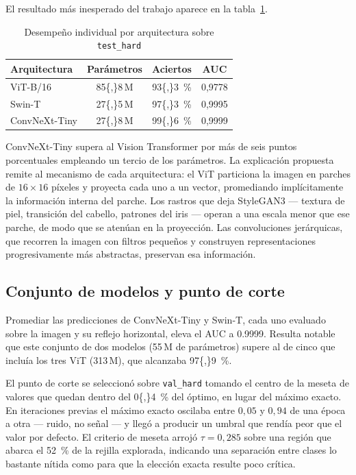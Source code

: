 \documentclass[10pt,twocolumn,letterpaper]{article}
\begin{document}
El resultado más inesperado del trabajo aparece en la
tabla~\ref{tab:arquitecturas}.

\begin{table}[t]
\caption{Desempeño individual por arquitectura sobre \texttt{test\_hard}}
\label{tab:arquitecturas}
\centering\small
\begin{tabular}{lccc}
\toprule
\textbf{Arquitectura} & \textbf{Parámetros} & \textbf{Aciertos} & \textbf{AUC} \\
\midrule
ViT-B/16        & \num{85{,}8}\,M & \SI{93{,}3}{\percent} & 0,9778 \\
Swin-T          & \num{27{,}5}\,M & \SI{97{,}3}{\percent} & 0,9995 \\
ConvNeXt-Tiny   & \num{27{,}8}\,M & \SI{99{,}6}{\percent} & 0,9999 \\
\bottomrule
\end{tabular}
\end{table}

ConvNeXt-Tiny supera al Vision Transformer por más de seis puntos
porcentuales empleando un tercio de los parámetros. La explicación
propuesta remite al mecanismo de cada arquitectura: el ViT particiona la
imagen en parches de $16\times16$ píxeles y proyecta cada uno a un vector,
promediando implícitamente la información interna del parche. Los rastros
que deja StyleGAN3 --- textura de piel, transición del cabello, patrones del
iris --- operan a una escala menor que ese parche, de modo que se atenúan
en la proyección. Las convoluciones jerárquicas, que recorren la imagen con
filtros pequeños y construyen representaciones progresivamente más
abstractas, preservan esa información.

\subsection{Conjunto de modelos y punto de corte}

Promediar las predicciones de ConvNeXt-Tiny y Swin-T, cada uno evaluado
sobre la imagen y su reflejo horizontal, eleva el AUC a \num{0.9999}.
Resulta notable que este conjunto de dos modelos
(\num{55}\,M de parámetros) supere al de cinco que incluía los
tres ViT (\num{313}\,M), que alcanzaba \SI{97{,}9}{\percent}.

El punto de corte se seleccionó sobre \texttt{val\_hard} tomando el centro
de la meseta de valores que quedan dentro del \SI{0{,}4}{\percent} del
óptimo, en lugar del máximo exacto. En iteraciones previas el máximo exacto
oscilaba entre $0{,}05$ y $0{,}94$ de una época a otra --- ruido, no
señal --- y llegó a producir un umbral que rendía peor que el valor por
defecto. El criterio de meseta arrojó $\tau=0{,}285$ sobre una región que
abarca el \SI{52}{\percent} de la rejilla explorada, indicando una
separación entre clases lo bastante nítida como para que la elección exacta
resulte poco crítica.
\end{document}
